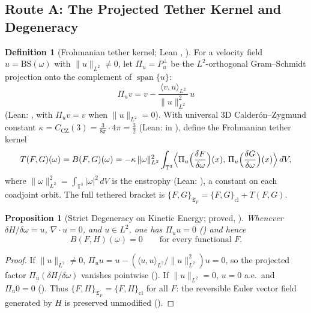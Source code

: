 \documentclass[11pt,a4paper]{article}
\theoremstyle{plain}
\newtheorem{proposition}{Proposition}[section]
\theoremstyle{definition}
\newtheorem{definition}{Definition}[section]
\theoremstyle{remark}
\newcommand{\T}{\mathbb{T}^3}
\newcommand{\Tf}{\mathfrak{T}_F}
\newcommand{\CZ}{C_{\mathrm{CZ}}}
\begin{document}
\subsection{Route A: The Projected Tether Kernel and Degeneracy}
\begin{definition}[Frohmanian tether kernel; Lean , ]\label{def:tether}
For a velocity field $u=\mathrm{BS}(\omega)$ with $\|u\|_{L^2}\neq0$, let $\Pi_u=P^\perp_u$ be the $L^2$-orthogonal Gram--Schmidt projection onto the complement of $\operatorname{span}\{u\}$:
\[
\Pi_u v=v-\frac{\langle v,u\rangle_{L^2}}{\|u\|_{L^2}^2}\,u
\]
(Lean: , with $\Pi_u v=v$ when $\|u\|_{L^2}=0$). With universal 3D Calderón--Zygmund constant $\kappa=\CZ(3)=\frac{3}{8\pi}\cdot 4\pi=\frac{3}{2}$ (Lean:  in ), define the Frohmanian tether kernel
\[
T(F,G)(\omega)=B(F,G)(\omega)=-\kappa\,\|\omega\|_{L^2}^2\int_{\T}\Bigl\langle \Pi_u\Bigl(\frac{\delta F}{\delta\omega}\Bigr)(x),\,\Pi_u\Bigl(\frac{\delta G}{\delta\omega}\Bigr)(x)\Bigr\rangle\,dV ,
\]
where $\|\omega\|_{L^2}^2=\int_{\T}|\omega|^2\,dV$ is the enstrophy (Lean: ), a constant on each coadjoint orbit. The full tethered bracket is $\{F,G\}_{\Tf}=\{F,G\}_{\mathrm{cl}}+T(F,G)$.
\end{definition}

\begin{proposition}[Strict Degeneracy on Kinetic Energy; proved, ]\label{prop:degen}
Whenever $\delta H/\delta\omega=u$, $\nabla\cdot u=0$, and $u\in L^2$, one has $\Pi_u u=0$ () and hence
\[
B(F,H)(\omega)=0\qquad\text{for every functional }F.
\]
\end{proposition}
\begin{proof}
If $\|u\|_{L^2}\ne0$, $\Pi_u u=u-(\langle u,u\rangle_{L^2}/\|u\|_{L^2}^2)u=0$, so the projected factor $\Pi_u(\delta H/\delta\omega)$ vanishes pointwise (). If $\|u\|_{L^2}=0$, $u=0$ a.e.\ and $\Pi_u 0=0$ (). Thus $\{F,H\}_{\Tf}=\{F,H\}_{\mathrm{cl}}$ for all $F$: the reversible Euler vector field generated by $H$ is preserved unmodified ().
\end{proof}
\end{document}
